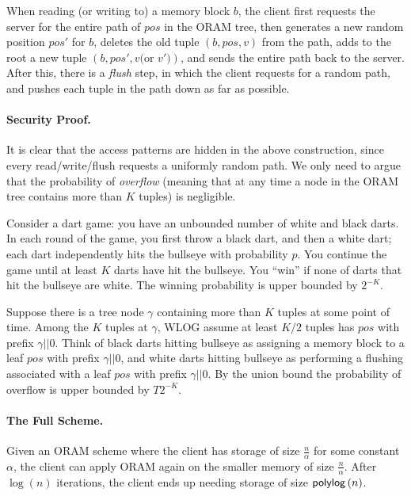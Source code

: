 When reading (or writing to) a memory block $b$, the client first requests the server for the entire path of $pos$ in the ORAM tree, then generates a new random position $pos'$ for $b$, deletes the old tuple $(b, pos, v)$ from the path, adds to the root a new tuple $(b, pos', v\text{(or $v'$)})$, and sends the entire path back to the server. After this, there is a \emph{flush} step, in which the client requests for a random path, and pushes each tuple in the path down as far as possible.


\paragraph{Security Proof.}
It is clear that the access patterns are hidden in the above construction, since every read/write/flush requests a uniformly random path. We only need to argue that the probability of \emph{overflow} (meaning that at any time a node in the ORAM tree contains more than $K$ tuples) is negligible.

Consider a dart game: you have an unbounded number of white and black darts. In each round of the game, you first throw a black dart, and then a white dart; each dart independently hits the bullseye with probability $p$. You continue the game until at least $K$ darts have hit the bullseye. You ``win'' if none of darts that hit the bullseye are white. The winning probability is upper bounded by $2^{-K}$.

Suppose there is a tree node $\gamma$ containing more than $K$ tuples at some point of time. Among the $K$ tuples at $\gamma$, WLOG assume at least $K/2$ tuples has $pos$ with prefix $\gamma||0$.
Think of black darts hitting bullseye as assigning a memory block to a leaf $pos$ with prefix $\gamma||0$, and white darts hitting bullseye as performing a flushing associated with a leaf $pos$ with prefix $\gamma||0$. By the union bound the probability of overflow is upper bounded by $T2^{-K}$.


\paragraph{The Full Scheme.}
Given an ORAM scheme where the client has storage of size $\frac{n}{\alpha}$ for some constant $\alpha$, the client can apply ORAM again on the smaller memory of size $\frac{n}{\alpha}$. After $\log(n)$ iterations, the client ends up needing storage of size ${\sf polylog}\left(n\right)$.



